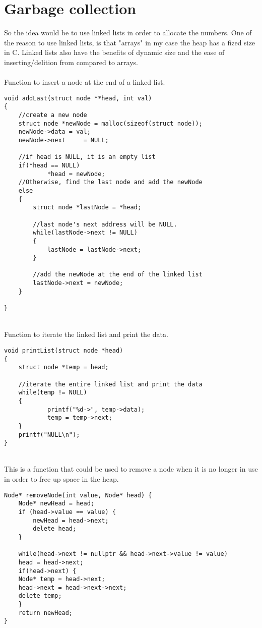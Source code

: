 \section{Garbage collection}
So the idea would be to use linked lists in order to allocate the numbers. One 
of the reason to use linked lists, is that "arrays" in my case the heap has a
fized size in C.
Linked lists also have the benefits of dynamic size and the ease of inserting/delition from
compared to arrays.
\\
\\
Function to insert a node at the end of a linked list.
\begin{verbatim}
void addLast(struct node **head, int val)
{
    //create a new node
    struct node *newNode = malloc(sizeof(struct node));
    newNode->data = val;
    newNode->next     = NULL;

    //if head is NULL, it is an empty list
    if(*head == NULL)
            *head = newNode;
    //Otherwise, find the last node and add the newNode
    else
    {
        struct node *lastNode = *head;

        //last node's next address will be NULL.
        while(lastNode->next != NULL)
        {
            lastNode = lastNode->next;
        }

        //add the newNode at the end of the linked list
        lastNode->next = newNode;
    }

}
\end{verbatim}
\\
Function to iterate the linked list and print the data.
\begin{verbatim}
void printList(struct node *head)
{
    struct node *temp = head;

    //iterate the entire linked list and print the data
    while(temp != NULL)
    {
            printf("%d->", temp->data);
            temp = temp->next;
    }
    printf("NULL\n");
}
\end{verbatim}
\\

This is a function that could be used to remove a node when it is no longer in use
in order to free up space in the heap.
\begin{verbatim}
Node* removeNode(int value, Node* head) {
    Node* newHead = head;
    if (head->value == value) {
        newHead = head->next;
        delete head;
    }

    while(head->next != nullptr && head->next->value != value)
    head = head->next;
    if(head->next) {
    Node* temp = head->next;
    head->next = head->next->next;
    delete temp;
    }
    return newHead;
}
\end{verbatim}